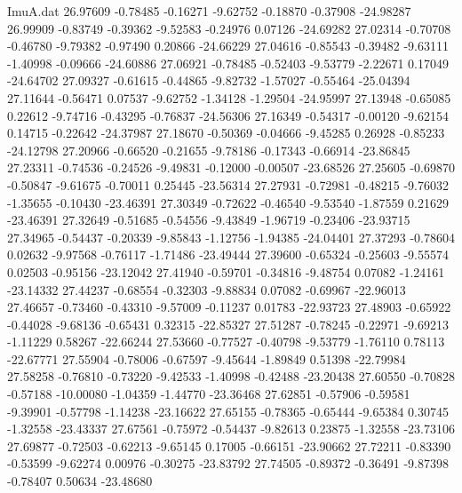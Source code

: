 \begin{filecontents}{ImuA.dat}
  26.97609   -0.78485   -0.16271   -9.62752   -0.18870   -0.37908  -24.98287
  26.99909   -0.83749   -0.39362   -9.52583   -0.24976    0.07126  -24.69282
  27.02314   -0.70708   -0.46780   -9.79382   -0.97490    0.20866  -24.66229
  27.04616   -0.85543   -0.39482   -9.63111   -1.40998   -0.09666  -24.60886
  27.06921   -0.78485   -0.52403   -9.53779   -2.22671    0.17049  -24.64702
  27.09327   -0.61615   -0.44865   -9.82732   -1.57027   -0.55464  -25.04394
  27.11644   -0.56471    0.07537   -9.62752   -1.34128   -1.29504  -24.95997
  27.13948   -0.65085    0.22612   -9.74716   -0.43295   -0.76837  -24.56306
  27.16349   -0.54317   -0.00120   -9.62154    0.14715   -0.22642  -24.37987
  27.18670   -0.50369   -0.04666   -9.45285    0.26928   -0.85233  -24.12798
  27.20966   -0.66520   -0.21655   -9.78186   -0.17343   -0.66914  -23.86845
  27.23311   -0.74536   -0.24526   -9.49831   -0.12000   -0.00507  -23.68526
  27.25605   -0.69870   -0.50847   -9.61675   -0.70011    0.25445  -23.56314
  27.27931   -0.72981   -0.48215   -9.76032   -1.35655   -0.10430  -23.46391
  27.30349   -0.72622   -0.46540   -9.53540   -1.87559    0.21629  -23.46391
  27.32649   -0.51685   -0.54556   -9.43849   -1.96719   -0.23406  -23.93715
  27.34965   -0.54437   -0.20339   -9.85843   -1.12756   -1.94385  -24.04401
  27.37293   -0.78604    0.02632   -9.97568   -0.76117   -1.71486  -23.49444
  27.39600   -0.65324   -0.25603   -9.55574    0.02503   -0.95156  -23.12042
  27.41940   -0.59701   -0.34816   -9.48754    0.07082   -1.24161  -23.14332
  27.44237   -0.68554   -0.32303   -9.88834    0.07082   -0.69967  -22.96013
  27.46657   -0.73460   -0.43310   -9.57009   -0.11237    0.01783  -22.93723
  27.48903   -0.65922   -0.44028   -9.68136   -0.65431    0.32315  -22.85327
  27.51287   -0.78245   -0.22971   -9.69213   -1.11229    0.58267  -22.66244
  27.53660   -0.77527   -0.40798   -9.53779   -1.76110    0.78113  -22.67771
  27.55904   -0.78006   -0.67597   -9.45644   -1.89849    0.51398  -22.79984
  27.58258   -0.76810   -0.73220   -9.42533   -1.40998   -0.42488  -23.20438
  27.60550   -0.70828   -0.57188  -10.00080   -1.04359   -1.44770  -23.36468
  27.62851   -0.57906   -0.59581   -9.39901   -0.57798   -1.14238  -23.16622
  27.65155   -0.78365   -0.65444   -9.65384    0.30745   -1.32558  -23.43337
  27.67561   -0.75972   -0.54437   -9.82613    0.23875   -1.32558  -23.73106
  27.69877   -0.72503   -0.62213   -9.65145    0.17005   -0.66151  -23.90662
  27.72211   -0.83390   -0.53599   -9.62274    0.00976   -0.30275  -23.83792
  27.74505   -0.89372   -0.36491   -9.87398   -0.78407    0.50634  -23.48680

\end{filecontents}
